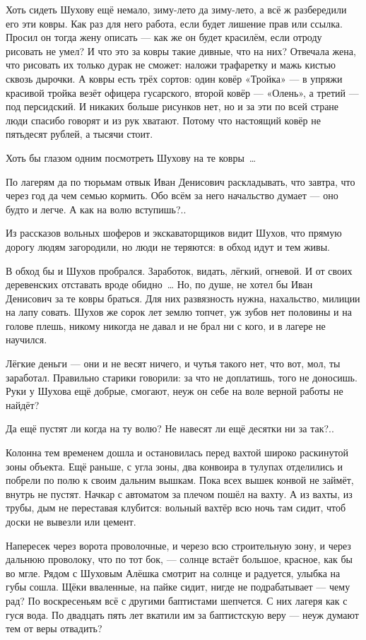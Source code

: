 Хоть сидеть Шухову ещё немало, зиму-лето да зиму-лето, а всё ж разбередили его эти ковры. Как раз для него работа, если будет лишение прав или ссылка. Просил он тогда жену описать --- как же он будет красилём, если отроду рисовать не умел? И что это за ковры такие дивные, что на них? Отвечала жена, что рисовать их только дурак не сможет: наложи трафаретку и мажь кистью сквозь дырочки. А ковры есть трёх сортов: один ковёр «Тройка» --- в упряжи красивой тройка везёт офицера гусарского, второй ковёр --- «Олень», а третий --- под персидский. И никаких больше рисунков нет, но и за эти по всей стране люди спасибо говорят и из рук хватают. Потому что настоящий ковёр не пятьдесят рублей, а тысячи стоит.

Хоть бы глазом одним посмотреть Шухову на те ковры~\dots{}

По лагерям да по тюрьмам отвык Иван Денисович раскладывать, что завтра, что через год да чем семью кормить. Обо всём за него начальство думает --- оно будто и легче. А как на волю вступишь?..

Из рассказов вольных шоферов и экскаваторщиков видит Шухов, что прямую дорогу людям загородили, но люди не теряются: в обход идут и тем живы.

В обход бы и Шухов пробрался. Заработок, видать, лёгкий, огневой. И от своих деревенских отставать вроде обидно~\dots{} Но, по душе, не хотел бы Иван Денисович за те ковры браться. Для них развязность нужна, нахальство, милиции на лапу совать. Шухов же сорок лет землю топчет, уж зубов нет половины и на голове плешь, никому никогда не давал и не брал ни с кого, и в лагере не научился.

Лёгкие деньги --- они и не весят ничего, и чутья такого нет, что вот, мол, ты заработал. Правильно старики говорили: за что не доплатишь, того не доносишь. Руки у Шухова ещё добрые, смогают, неуж он себе на воле верной работы не найдёт?

Да ещё пустят ли когда на ту волю? Не навесят ли ещё десятки ни за так?..

Колонна тем временем дошла и остановилась перед вахтой широко раскинутой зоны объекта. Ещё раньше, с угла зоны, два конвоира в тулупах отделились и побрели по полю к своим дальним вышкам. Пока всех вышек конвой не займёт, внутрь не пустят. Начкар с автоматом за плечом пошёл на вахту. А из вахты, из трубы, дым не переставая клубится: вольный вахтёр всю ночь там сидит, чтоб доски не вывезли или цемент.

Напересек через ворота проволочные, и черезо всю строительную зону, и через дальнюю проволоку, что по тот бок, --- солнце встаёт большое, красное, как бы во мгле. Рядом с Шуховым Алёшка смотрит на солнце и радуется, улыбка на губы сошла. Щёки вваленные, на пайке сидит, нигде не подрабатывает --- чему рад? По воскресеньям всё с другими баптистами шепчется. С них лагеря как с гуся вода. По двадцать пять лет вкатили им за баптистскую веру --- неуж думают тем от веры отвадить?

